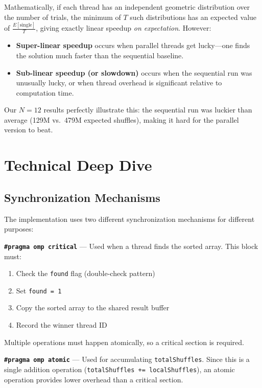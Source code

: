 \documentclass[11pt]{article}
\begin{document}
Mathematically, if each thread has an independent geometric distribution over the number of trials, the minimum of $T$ such distributions has an expected value of $\frac{E[\text{single}]}{T}$, giving exactly linear speedup \textit{on expectation}. However:

\begin{itemize}
    \item \textbf{Super-linear speedup} occurs when parallel threads get lucky---one finds the solution much faster than the sequential baseline.
    \item \textbf{Sub-linear speedup (or slowdown)} occurs when the sequential run was unusually lucky, or when thread overhead is significant relative to computation time.
\end{itemize}

Our $N = 12$ results perfectly illustrate this: the sequential run was luckier than average (129M vs.~479M expected shuffles), making it hard for the parallel version to beat.

\newpage

\section{Technical Deep Dive}

\subsection{Synchronization Mechanisms}

\begin{shadedbox}
The implementation uses two different synchronization mechanisms for different purposes:

\vspace{6pt}
\textbf{\texttt{\#pragma omp critical}} --- Used when a thread finds the sorted array. This block must:
\begin{enumerate}
    \item Check the \texttt{found} flag (double-check pattern)
    \item Set \texttt{found = 1}
    \item Copy the sorted array to the shared result buffer
    \item Record the winner thread ID
\end{enumerate}
Multiple operations must happen atomically, so a critical section is required.

\vspace{6pt}
\textbf{\texttt{\#pragma omp atomic}} --- Used for accumulating \texttt{totalShuffles}. Since this is a single addition operation (\texttt{totalShuffles += localShuffles}), an atomic operation provides lower overhead than a critical section.
\end{shadedbox}
\end{document}
